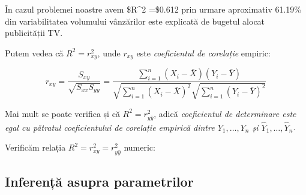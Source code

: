 \documentclass[]{article}
\newenvironment{Shaded}{\begin{snugshade}}{\end{snugshade}}
\newcommand{\KeywordTok}[1]{\textcolor[rgb]{0.13,0.29,0.53}{\textbf{#1}}}
\newcommand{\DecValTok}[1]{\textcolor[rgb]{0.00,0.00,0.81}{#1}}
\newcommand{\FloatTok}[1]{\textcolor[rgb]{0.00,0.00,0.81}{#1}}
\newcommand{\StringTok}[1]{\textcolor[rgb]{0.31,0.60,0.02}{#1}}
\newcommand{\CommentTok}[1]{\textcolor[rgb]{0.56,0.35,0.01}{\textit{#1}}}
\newcommand{\OperatorTok}[1]{\textcolor[rgb]{0.81,0.36,0.00}{\textbf{#1}}}
\newcommand{\NormalTok}[1]{#1}
\begin{document}
În cazul problemei noastre avem \$R\^{}2 =\$0.612 prin urmare
aproximativ 61.19\% din variabilitatea volumului vânzărilor este
explicată de bugetul alocat publicității TV.

Putem vedea că \(R^2=r_{xy}^2\), unde \(r_{xy}\) este \emph{coeficientul
de corelație} empiric:

\[
r_{xy}=\frac{S_{xy}}{\sqrt{S_{xx}S_{yy}}}=\frac{\sum_{i=1}^n \left(X_i-\bar X \right)\left(Y_i-\bar Y \right)}{\sqrt{\sum_{i=1}^n \left(X_i-\bar X \right)^2}\sqrt{\sum_{i=1}^n \left(Y_i-\bar Y \right)^2}}
\]

\begin{Shaded}
\end{Shaded}

Mai mult se poate verifica și că \(R^2=r^2_{y\hat y}\), adică
\emph{coeficientul de determinare este egal cu pătratul coeficientului
de corelație empirică dintre \(Y_1,\ldots,Y_n\) și
\(\hat Y_1,\ldots,\hat Y_n\)}.

Verificăm relația \(R^2=r^2_{xy}=r^2_{y\hat y}\) numeric:

\begin{Shaded}
\end{Shaded}

\subsection{Inferență asupra
parametrilor}\label{inferenta-asupra-parametrilor}
\end{document}

